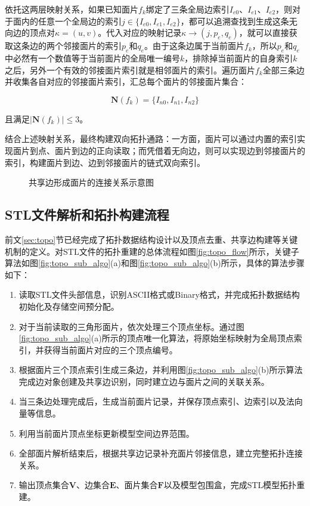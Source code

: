 依托这两层映射关系，如果已知面片$f_{k}$绑定了三条全局边索引$I_{e0}$、$I_{e1}$、$I_{e2}$，则对于面内的任意一个全局边的索引$j\in\{I_{e0},I_{e1},I_{e2}\}$，都可以追溯查找到生成这条无向边的顶点对$\kappa=(u,v)$。代入对应的映射记录$\kappa\to(j,p_{e},q_{e})$，就可以直接获取这条边的两个邻接面片的索引$p_{e}$和$q_{e}$。由于这条边属于当前面片$f_{k}$，所以$p_{e}$和$q_{e}$中必然有一个数值等于当前面片的全局唯一编号$k$，排除掉当前面片的自身索引$k$之后，另外一个有效的邻接面片索引就是相邻面片的索引。遍历面片$f_{k}$全部三条边并收集各自对应的邻接面片索引，汇总每个面片的邻接面片集合：

\begin{equation}
\bm{N}(f_{k})=\{I_{n0},I_{n1},I_{n2}\} \label{eq:neighbor}
\end{equation}

且满足$\left|\bm{N}(f_k)\right|\le 3$。

结合上述映射关系，最终构建双向拓扑通路：一方面，面片可以通过内置的索引实现面片到点、面片到边的正向读取；而凭借着无向边，则可以实现边到邻接面片的索引，构建面片到边、边到邻接面片的链式双向索引。

\begin{figure}[htbp]
\centering
\caption{共享边形成面片的连接关系示意图}
\label{fig:topo_shared_edge}
\end{figure}

\subsection{STL文件解析和拓扑构建流程}

前文\ref{sec:topo}节已经完成了拓扑数据结构设计以及顶点去重、共享边构建等关键机制的定义。对STL文件的拓扑重建的总体流程如图\ref{fig:topo_flow}所示，关键子算法如图\ref{fig:topo_sub_algo}(a)和图\ref{fig:topo_sub_algo}(b)所示，具体的算法步骤如下：

\begin{enumerate}
\item 读取STL文件头部信息，识别ASCII格式或Binary格式，并完成拓扑数据结构初始化及存储空间预分配。
\item 对于当前读取的三角形面片，依次处理三个顶点坐标。通过图\ref{fig:topo_sub_algo}(a)所示的顶点唯一化算法，将原始坐标映射为全局顶点索引，并获得当前面片对应的三个顶点编号。
\item 根据面片三个顶点索引生成三条边，并利用图\ref{fig:topo_sub_algo}(b)所示算法完成边对象创建及共享边识别，同时建立边与面片之间的关联关系。
\item 当三条边处理完成后，生成当前面片记录，并保存顶点索引、边索引以及法向量等信息。
\item 利用当前面片顶点坐标更新模型空间边界范围。
\item 全部面片解析结束后，根据共享边记录补充面片邻接信息，建立完整拓扑连接关系。
\item 输出顶点集合$\bm{V}$、边集合$\bm{E}$、面片集合$\bm{F}$以及模型包围盒，完成STL模型拓扑重建。
\end{enumerate}

